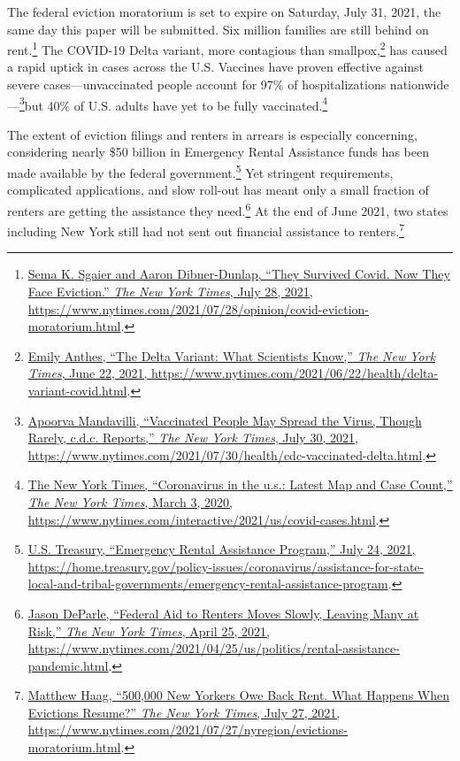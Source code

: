 \documentclass[
  openany]{book}
\begin{document}
The federal eviction moratorium is set to expire on Saturday, July 31, 2021, the same day this paper will be submitted. Six million families are still behind on rent.\footnote{\protect\hyperlink{ref-sgaier2021}{Sema K. Sgaier and Aaron Dibner-Dunlap, {``They Survived Covid. Now They Face Eviction.''} \emph{The New York Times}, July 28, 2021, \url{https://www.nytimes.com/2021/07/28/opinion/covid-eviction-moratorium.html}}.} The COVID-19 Delta variant, more contagious than smallpox,\footnote{\protect\hyperlink{ref-anthes2021}{Emily Anthes, {``The Delta Variant: What Scientists Know,''} \emph{The New York Times}, June 22, 2021, \url{https://www.nytimes.com/2021/06/22/health/delta-variant-covid.html}}.} has caused a rapid uptick in cases across the U.S. Vaccines have proven effective against severe cases---unvaccinated people account for 97\% of hospitalizations nationwide---\footnote{\protect\hyperlink{ref-mandavilli2021}{Apoorva Mandavilli, {``Vaccinated People May Spread the Virus, Though Rarely, c.d.c. Reports,''} \emph{The New York Times}, July 30, 2021, \url{https://www.nytimes.com/2021/07/30/health/cdc-vaccinated-delta.html}}.}but 40\% of U.S. adults have yet to be fully vaccinated.\footnote{\protect\hyperlink{ref-thenewyorktimes2020}{The New York Times, {``Coronavirus in the u.s.: Latest Map and Case Count,''} \emph{The New York Times}, March 3, 2020, \url{https://www.nytimes.com/interactive/2021/us/covid-cases.html}}.}

The extent of eviction filings and renters in arrears is especially concerning, considering nearly \$50 billion in Emergency Rental Assistance funds has been made available by the federal government.\footnote{\protect\hyperlink{ref-u.s.treasury2021}{U.S. Treasury, {``Emergency Rental Assistance Program,''} July 24, 2021, \url{https://home.treasury.gov/policy-issues/coronavirus/assistance-for-state-local-and-tribal-governments/emergency-rental-assistance-program}}.} Yet stringent requirements, complicated applications, and slow roll-out has meant only a small fraction of renters are getting the assistance they need.\footnote{\protect\hyperlink{ref-deparle2021}{Jason DeParle, {``Federal Aid to Renters Moves Slowly, Leaving Many at Risk,''} \emph{The New York Times}, April 25, 2021, \url{https://www.nytimes.com/2021/04/25/us/politics/rental-assistance-pandemic.html}}.} At the end of June 2021, two states including New York still had not sent out financial assistance to renters.\footnote{\protect\hyperlink{ref-haag2021}{Matthew Haag, {``500,000 New Yorkers Owe Back Rent. What Happens When Evictions Resume?''} \emph{The New York Times}, July 27, 2021, \url{https://www.nytimes.com/2021/07/27/nyregion/evictions-moratorium.html}}.}
\end{document}
